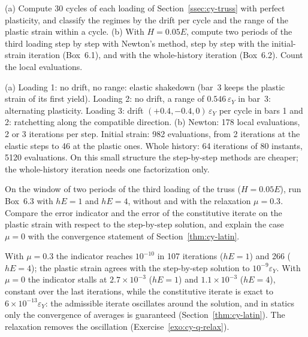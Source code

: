 \label{exo:cy-truss}
%
(a) Compute 30 cycles of each loading of Section~\ref{ssec:cy-truss} with
perfect plasticity, and classify the regimes by the drift per cycle and the
range of the plastic strain within a cycle. (b) With $H=0.05E$, compute two
periods of the third loading step by step with Newton's method, step by step
with the initial-strain iteration (Box~6.1), and with the whole-history
iteration (Box~6.2). Count the local evaluations.
\begin{solution}
(a) Loading 1: no drift, no range: elastic shakedown (bar~3 keeps the
plastic strain of its first yield). Loading 2: no drift, a range of
$0.546\,\varepsilon_Y$ in bar~3: alternating plasticity. Loading 3: drift
$(+0.4,-0.4,0)\,\varepsilon_Y$ per cycle in bars 1 and 2: ratchetting along the
compatible direction. (b) Newton: 178 local evaluations, 2 or 3 iterations per
step. Initial strain: 982 evaluations, from 2 iterations at the elastic steps
to 46 at the plastic ones. Whole history: 64 iterations of 80 instants, 5120
evaluations. On this small structure the step-by-step methods are cheaper; the
whole-history iteration needs one factorization only.

\end{solution}

\label{exo:cy-latin}
%
On the window of two periods of the third loading of the truss ($H=0.05E$),
run Box~6.3 with $hE=1$ and $hE=4$, without and with the relaxation $\mu=0.3$.
Compare the error indicator and the error of the constitutive iterate on the
plastic strain with respect to the step-by-step solution, and explain the
case $\mu=0$ with the convergence statement of Section~\ref{thm:cy-latin}.
\begin{solution}
With $\mu=0.3$ the indicator reaches $10^{-10}$ in 107 iterations ($hE=1$) and
266 ($hE=4$); the plastic strain agrees with the step-by-step solution to
$10^{-9}\varepsilon_Y$. With $\mu=0$ the indicator stalls at $2.7\times10^{-3}$
($hE=1$) and $1.1\times10^{-3}$ ($hE=4$), constant over the last iterations,
while the constitutive iterate is exact to $6\times10^{-13}\varepsilon_Y$: the
admissible iterate oscillates around the solution, and in statics only the
convergence of averages is guaranteed (Section~\ref{thm:cy-latin}). The relaxation removes the
oscillation (Exercise~\ref{exo:cy-q-relax}).

\end{solution}

